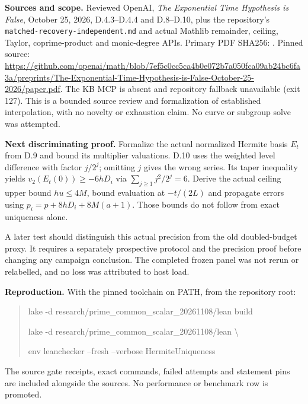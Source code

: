 \documentclass[11pt]{article}
\begin{document}
\textbf{Sources and scope.}
Reviewed OpenAI, \emph{The Exponential Time Hypothesis is False}, October 25,
2026, D.4.3--D.4.4 and D.8--D.10, plus the repository's
\texttt{matched-recovery-independent.md} and actual Mathlib remainder, ceiling,
Taylor, coprime-product and monic-degree APIs. Primary PDF SHA256:
.
Pinned source:
\url{https://github.com/openai/math/blob/7ef5c0cc5ca4b0e072b7a050fca09ab24bc6fa3a/preprints/The-Exponential-Time-Hypothesis-is-False-October-25-2026/paper.pdf}.
The KB MCP is absent and repository fallback unavailable (exit 127). This is
a bounded source review and formalization of established interpolation, with
no novelty or exhaustion claim. No curve or subgroup solve was attempted.

\textbf{Next discriminating proof.}
Formalize the actual normalized Hermite basis $E_t$ from D.9 and bound its
multiplier valuations. D.10 uses the weighted level difference with factor
$j/2^j$; omitting $j$ gives the wrong series. Its taper inequality yields
$v_2(E_t(0))\geq-6hD_i$ via $\sum_{j\geq1}j^2/2^j=6$.
Derive the actual ceiling upper bound $hu\leq4M$, bound evaluation at
$-t/(2L)$ and propagate errors using $p_i=p+8hD_i+8M(a+1)$.
Those bounds do not follow from exact uniqueness alone.

A later test should distinguish this actual precision from the old doubled-budget
proxy. It requires a separately prospective protocol and the precision proof
before changing any campaign conclusion. The completed frozen panel was not
rerun or relabelled, and no loss was attributed to host load.

\textbf{Reproduction.}
With the pinned toolchain on PATH, from the repository root:
\begin{quote}\small\ttfamily
lake -d research/prime\_common\_scalar\_20261108/lean build\par
lake -d research/prime\_common\_scalar\_20261108/lean \textbackslash\par
\quad env leanchecker --fresh --verbose HermiteUniqueness
\end{quote}
The source gate receipts, exact commands, failed attempts and statement pins
are included alongside the sources. No performance or benchmark row is promoted.
\end{document}
